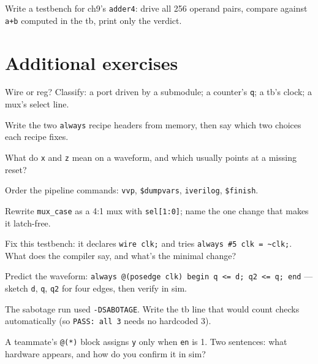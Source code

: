 \begin{exercise}[hard]
Write a testbench for ch9's \texttt{adder4}: drive all 256 operand
pairs, compare against \texttt{a+b} computed in the tb, print only the
verdict.
\end{exercise}

\section*{Additional exercises}

\begin{exercise}[easy]
Wire or reg? Classify: a port driven by a submodule; a counter's
\texttt{q}; a tb's clock; a mux's select line.
\end{exercise}
\begin{exercise}[easy]
Write the two \texttt{always} recipe headers from memory, then say
which two choices each recipe fixes.
\end{exercise}
\begin{exercise}[easy]
What do \texttt{x} and \texttt{z} mean on a waveform, and which usually
points at a missing reset?
\end{exercise}
\begin{exercise}[easy]
Order the pipeline commands: \texttt{vvp}, \texttt{\$dumpvars},
\texttt{iverilog}, \texttt{\$finish}.
\end{exercise}
\begin{exercise}[medium]
Rewrite \texttt{mux\_case} as a 4:1 mux with \texttt{sel[1:0]}; name
the one change that makes it latch-free.
\end{exercise}
\begin{exercise}[medium]
Fix this testbench: it declares \texttt{wire clk;} and tries
\texttt{always \#5 clk = \textasciitilde clk;}. What does the compiler
say, and what's the minimal change?
\end{exercise}
\begin{exercise}[medium]
Predict the waveform: \texttt{always @(posedge clk) begin q <= d;
q2 <= q; end} --- sketch \texttt{d}, \texttt{q}, \texttt{q2} for four
edges, then verify in sim.
\end{exercise}
\begin{exercise}[medium]
The sabotage run used \texttt{-DSABOTAGE}. Write the tb line that would
count checks automatically (so \texttt{PASS: all 3} needs no hardcoded
3).
\end{exercise}
\begin{exercise}[medium]
A teammate's \texttt{@(*)} block assigns \texttt{y} only when
\texttt{en} is 1. Two sentences: what hardware appears, and how do you
confirm it in sim?
\end{exercise}
